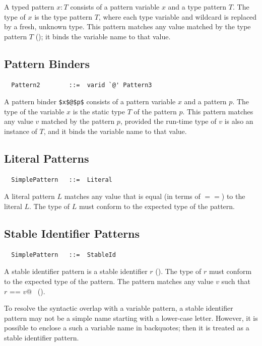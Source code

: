 A typed pattern $x: T$ consists of a pattern variable $x$ and a
type pattern $T$.  The type of $x$ is the type pattern $T$, where 
each type variable and wildcard is replaced by a fresh, unknown type.
This pattern matches any value matched by the type
pattern $T$ (); it binds the variable name to
that value.  

\subsection{Pattern Binders}
\label{sec:pattern-binders}
\syntax
\begin{lstlisting}
  Pattern2        ::=  varid `@' Pattern3
\end{lstlisting}
A pattern binder \lstinline|$x$@$p$| consists of a pattern variable $x$ and a 
pattern $p$. The type of the variable $x$ is the static type $T$ of the pattern $p$.
This pattern matches any value $v$ matched by the pattern $p$, 
provided the run-time type of $v$ is also an instance of $T$, 
and it binds the variable name to that value.

\subsection{Literal Patterns}

\syntax\begin{lstlisting}
  SimplePattern   ::=  Literal
\end{lstlisting}

A literal pattern $L$ matches any value that is equal (in terms of
$==$) to the literal $L$. The type of $L$ must conform to the
expected type of the pattern.

\subsection{Stable Identifier Patterns} 

\syntax
\begin{lstlisting}
  SimplePattern   ::=  StableId
\end{lstlisting}

A stable identifier pattern is a stable identifier $r$
(). The type of $r$ must conform to the expected
type of the pattern. The pattern matches any value $v$ such that
~\lstinline@$r$ == $v$@~ ().

To resolve the syntactic overlap with a variable pattern, a
stable identifier pattern may not be a simple name starting with a lower-case
letter. However, it is possible to enclose a such a variable name in
backquotes; then it is treated as a stable identifier pattern.


